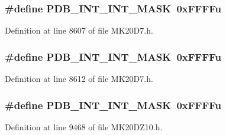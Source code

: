 \subsubsection[{\texorpdfstring{P\+D\+B\+\_\+\+I\+N\+T\+\_\+\+I\+N\+T\+\_\+\+M\+A\+SK}{PDB_INT_INT_MASK}}]{\setlength{\rightskip}{0pt plus 5cm}\#define P\+D\+B\+\_\+\+I\+N\+T\+\_\+\+I\+N\+T\+\_\+\+M\+A\+SK~0x\+F\+F\+F\+Fu}\hypertarget{group___p_d_b___register___masks_ga04262fdbd8c3565c23a025cb119f1549}{}\label{group___p_d_b___register___masks_ga04262fdbd8c3565c23a025cb119f1549}


Definition at line 8607 of file M\+K20\+D7.\+h.

\subsubsection[{\texorpdfstring{P\+D\+B\+\_\+\+I\+N\+T\+\_\+\+I\+N\+T\+\_\+\+M\+A\+SK}{PDB_INT_INT_MASK}}]{\setlength{\rightskip}{0pt plus 5cm}\#define P\+D\+B\+\_\+\+I\+N\+T\+\_\+\+I\+N\+T\+\_\+\+M\+A\+SK~0x\+F\+F\+F\+Fu}\hypertarget{group___p_d_b___register___masks_ga04262fdbd8c3565c23a025cb119f1549}{}\label{group___p_d_b___register___masks_ga04262fdbd8c3565c23a025cb119f1549}


Definition at line 8612 of file M\+K20\+D7.\+h.

\subsubsection[{\texorpdfstring{P\+D\+B\+\_\+\+I\+N\+T\+\_\+\+I\+N\+T\+\_\+\+M\+A\+SK}{PDB_INT_INT_MASK}}]{\setlength{\rightskip}{0pt plus 5cm}\#define P\+D\+B\+\_\+\+I\+N\+T\+\_\+\+I\+N\+T\+\_\+\+M\+A\+SK~0x\+F\+F\+F\+Fu}\hypertarget{group___p_d_b___register___masks_ga04262fdbd8c3565c23a025cb119f1549}{}\label{group___p_d_b___register___masks_ga04262fdbd8c3565c23a025cb119f1549}


Definition at line 9468 of file M\+K20\+D\+Z10.\+h.

